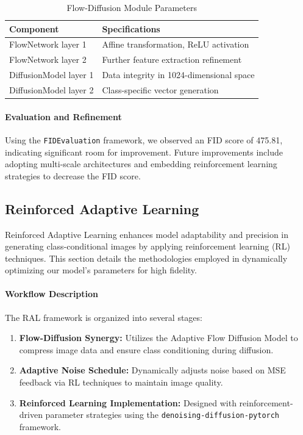 \documentclass{article} %
\begin{document}
\begin{table}[!ht]
\centering
\label{tab:flow-diffusion-params}
\begin{tabular}{|l|l|}
\hline
\textbf{Component} & \textbf{Specifications} \\ \hline
FlowNetwork layer 1 & Affine transformation, ReLU activation \\ \hline
FlowNetwork layer 2 & Further feature extraction refinement \\ \hline
DiffusionModel layer 1 & Data integrity in 1024-dimensional space \\ \hline
DiffusionModel layer 2 & Class-specific vector generation \\ \hline
\end{tabular}
\caption{Flow-Diffusion Module Parameters}
\end{table}

\paragraph{Evaluation and Refinement}
Using the \texttt{FIDEvaluation} framework, we observed an FID score of 475.81, indicating significant room for improvement. Future improvements include adopting multi-scale architectures and embedding reinforcement learning strategies to decrease the FID score.

\subsection{Reinforced Adaptive Learning}

Reinforced Adaptive Learning enhances model adaptability and precision in generating class-conditional images by applying reinforcement learning (RL) techniques. This section details the methodologies employed in dynamically optimizing our model's parameters for high fidelity.

\paragraph{Workflow Description}
The RAL framework is organized into several stages:

\begin{enumerate}
    \item \textbf{Flow-Diffusion Synergy:} Utilizes the Adaptive Flow Diffusion Model to compress image data and ensure class conditioning during diffusion.
    
    \item \textbf{Adaptive Noise Schedule:} Dynamically adjusts noise based on MSE feedback via RL techniques to maintain image quality.
    
    \item \textbf{Reinforced Learning Implementation:} Designed with reinforcement-driven parameter strategies using the \texttt{denoising-diffusion-pytorch} framework.
\end{enumerate}
\end{document}
